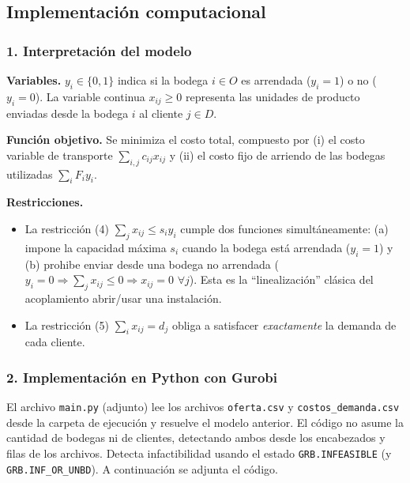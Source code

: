 \documentclass{article}
\begin{document}
\newpage
\subsection{Implementaci\'on computacional}

\subsubsection*{1. Interpretaci\'on del modelo}

\textbf{Variables.} $y_i\in\{0,1\}$ indica si la bodega $i\in O$ es arrendada ($y_i=1$) o no ($y_i=0$). La variable continua $x_{ij}\geq 0$ representa las unidades de producto enviadas desde la bodega $i$ al cliente $j\in D$.

\smallskip
\textbf{Funci\'on objetivo.} Se minimiza el costo total, compuesto por (i) el costo variable de transporte $\sum_{i,j}c_{ij}x_{ij}$ y (ii) el costo fijo de arriendo de las bodegas utilizadas $\sum_i F_i y_i$.

\smallskip
\textbf{Restricciones.}
\begin{itemize}
    \item La restricci\'on (4) $\sum_j x_{ij}\leq s_i y_i$ cumple dos funciones simult\'aneamente: (a) impone la capacidad m\'axima $s_i$ cuando la bodega est\'a arrendada ($y_i=1$) y (b) prohibe enviar desde una bodega no arrendada ($y_i=0 \Rightarrow \sum_j x_{ij}\leq 0 \Rightarrow x_{ij}=0$ $\forall j$). Esta es la ``linealizaci\'on'' cl\'asica del acoplamiento abrir/usar una instalaci\'on.
    \item La restricci\'on (5) $\sum_i x_{ij}= d_j$ obliga a satisfacer \emph{exactamente} la demanda de cada cliente.
\end{itemize}

\subsubsection*{2. Implementaci\'on en Python con Gurobi}

El archivo \texttt{main.py} (adjunto) lee los archivos \texttt{oferta.csv} y \texttt{costos\_demanda.csv} desde la carpeta de ejecuci\'on y resuelve el modelo anterior. El c\'odigo no asume la cantidad de bodegas ni de clientes, detectando ambos desde los encabezados y filas de los archivos. Detecta infactibilidad usando el estado \texttt{GRB.INFEASIBLE} (y \texttt{GRB.INF\_OR\_UNBD}). A continuaci\'on se adjunta el c\'odigo.


\end{document}
